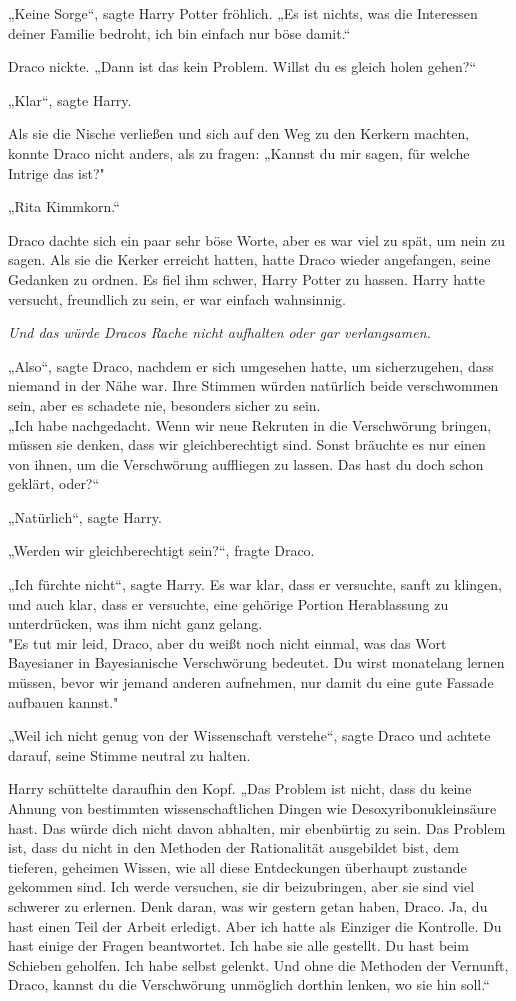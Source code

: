 {„Keine Sorge“, sagte Harry Potter fröhlich. „Es ist nichts, was die Interessen deiner Familie bedroht, ich bin einfach nur böse damit.“

Draco nickte. „Dann ist das kein Problem. Willst du es gleich holen gehen?“

„Klar“, sagte Harry.

Als sie die Nische verließen und sich auf den Weg zu den Kerkern machten, konnte Draco nicht anders, als zu fragen: „Kannst du mir sagen, für welche Intrige das ist?"

„Rita Kimmkorn.“

Draco dachte sich ein paar sehr böse Worte, aber es war viel zu spät, um nein zu sagen. Als sie die Kerker erreicht hatten, hatte Draco wieder angefangen, seine Gedanken zu ordnen. Es fiel ihm schwer, Harry Potter zu hassen. Harry hatte versucht, freundlich zu sein, er war einfach wahnsinnig.

\emph{Und das würde Dracos Rache nicht aufhalten oder gar verlangsamen.}

„Also“, sagte Draco, nachdem er sich umgesehen hatte, um sicherzugehen, dass niemand in der Nähe war. Ihre Stimmen würden natürlich beide verschwommen sein, aber es schadete nie, besonders sicher zu sein.\\ „Ich habe nachgedacht. Wenn wir neue Rekruten in die Verschwörung bringen, müssen sie denken, dass wir gleichberechtigt sind. Sonst bräuchte es nur einen von ihnen, um die Verschwörung auffliegen zu lassen. Das hast du doch schon geklärt, oder?“

„Natürlich“, sagte Harry.

„Werden wir gleichberechtigt sein?“, fragte Draco.

„Ich fürchte nicht“, sagte Harry. Es war klar, dass er versuchte, sanft zu klingen, und auch klar, dass er versuchte, eine gehörige Portion Herablassung zu unterdrücken, was ihm nicht ganz gelang.\\ "Es tut mir leid, Draco, aber du weißt noch nicht einmal, was das Wort Bayesianer in Bayesianische Verschwörung bedeutet. Du wirst monatelang lernen müssen, bevor wir jemand anderen aufnehmen, nur damit du eine gute Fassade aufbauen kannst."

„Weil ich nicht genug von der Wissenschaft verstehe“, sagte Draco und achtete darauf, seine Stimme neutral zu halten.

Harry schüttelte daraufhin den Kopf. „Das Problem ist nicht, dass du keine Ahnung von bestimmten wissenschaftlichen Dingen wie Desoxyribonukleinsäure hast. Das würde dich nicht davon abhalten, mir ebenbürtig zu sein. Das Problem ist, dass du nicht in den Methoden der Rationalität ausgebildet bist, dem tieferen, geheimen Wissen, wie all diese Entdeckungen überhaupt zustande gekommen sind. Ich werde versuchen, sie dir beizubringen, aber sie sind viel schwerer zu erlernen. Denk daran, was wir gestern getan haben, Draco. Ja, du hast einen Teil der Arbeit erledigt. Aber ich hatte als Einziger die Kontrolle. Du hast einige der Fragen beantwortet. Ich habe sie alle gestellt. Du hast beim Schieben geholfen. Ich habe selbst gelenkt. Und ohne die Methoden der Vernunft, Draco, kannst du die Verschwörung unmöglich dorthin lenken, wo sie hin soll.“

}
